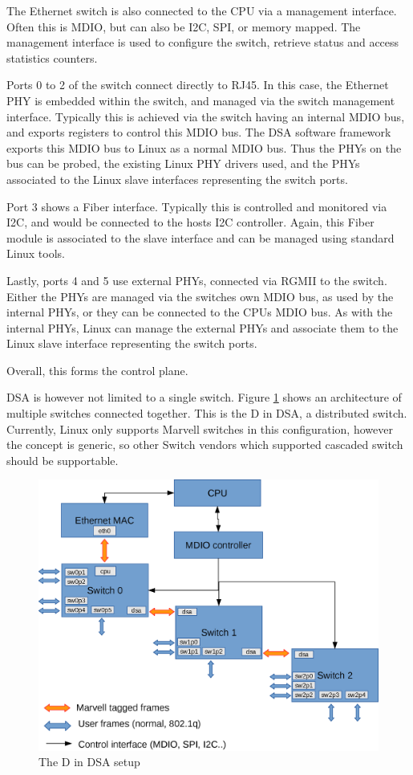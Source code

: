 \documentclass[letterpaper]{article}
\begin{document}
The Ethernet switch is also connected to the CPU via a management
interface. Often this is MDIO, but can also be I2C, SPI, or memory
mapped. The management interface is used to configure the switch,
retrieve status and access statistics counters.

Ports 0 to 2 of the switch connect directly to RJ45. In this case, the
Ethernet PHY is embedded within the switch, and managed via the switch
management interface. Typically this is achieved via the switch having
an internal MDIO bus, and exports registers to control this MDIO
bus. The DSA software framework exports this MDIO bus to Linux as a
normal MDIO bus. Thus the PHYs on the bus can be probed, the existing
Linux PHY drivers used, and the PHYs associated to the Linux slave
interfaces representing the switch ports.

Port 3 shows a Fiber interface. Typically this is controlled and
monitored via I2C, and would be connected to the hosts I2C
controller. Again, this Fiber module is associated to the slave
interface and can be managed using standard Linux tools.

Lastly, ports 4 and 5 use external PHYs, connected via RGMII to the
switch. Either the PHYs are managed via the switches own MDIO bus, as
used by the internal PHYs, or they can be connected to the CPUs MDIO
bus. As with the internal PHYs, Linux can manage the external PHYs and
associate them to the Linux slave interface representing the switch
ports.

Overall, this forms the control plane.

DSA is however not limited to a single switch. Figure \ref{d-in-dsa}
shows an architecture of multiple switches connected together. This is
the D in DSA, a distributed switch. Currently, Linux only supports
Marvell switches in this configuration, however the concept is
generic, so other Switch vendors which supported cascaded switch
should be supportable.

\begin{figure}[ht]
  \centering
  \includegraphics[width=\columnwidth]{DSA-D-in-DSA.eps}
  \caption{The D in DSA setup}
  \label{d-in-dsa}
\end{figure}
\end{document}
